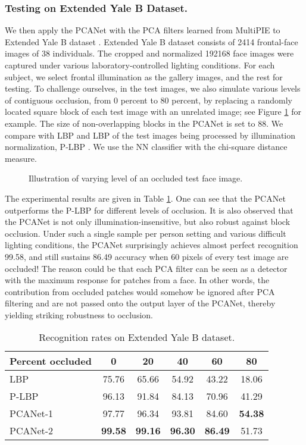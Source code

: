 \documentclass[10pt,journal,compsoc]{IEEEtran}
\begin{document}
\subsubsection{Testing on Extended Yale B Dataset.}\label{sec: ExtendedYaleB}
We then apply the PCANet with the PCA filters learned from MultiPIE to Extended Yale B dataset \cite{Georghiades2001}. Extended Yale B dataset consists of 2414 frontal-face images of 38 individuals. The cropped and normalized 192168 face images were captured under various laboratory-controlled lighting conditions. For each subject, we select frontal illumination as the gallery images, and the rest for testing. To challenge ourselves, in the test images, we also simulate various levels of contiguous occlusion, from 0 percent to 80 percent, by replacing a randomly located square block of each test image with an unrelated image; see Figure \ref{fig: EYaleB_occlusion} for example. The size of non-overlapping blocks in the PCANet is set to 88. We compare with LBP \cite{Ahonen2006} and LBP of the test images being processed by illumination normalization, P-LBP \cite{Tan2010}. We use the NN classifier with the chi-square distance measure.


\begin{figure}[t]
\centering
{}
\caption{Illustration of varying level of an occluded test face image.}\label{fig: EYaleB_occlusion}
\end{figure}


The experimental results are given in Table \ref{table: ExtendedYaleB}. One can see that the PCANet outperforms the P-LBP for different levels of occlusion. It is also observed that the PCANet is not only illumination-insensitive, but also robust against block occlusion. Under such a single sample per person setting and various difficult lighting conditions, the PCANet surprisingly achieves almost perfect recognition 99.58, and still sustains 86.49 accuracy when 60 pixels of every test image are occluded! The reason could be that each PCA filter can be seen as a detector with the maximum response for patches from a face. In other words, the contribution from occluded patches would somehow be ignored after PCA filtering and are not passed onto the output layer of the PCANet, thereby yielding striking robustness to occlusion.

\begin{table}\centering
\caption{Recognition rates  on Extended Yale B dataset.}
\begin{tabular}{l|c|c|c|c|c}
  \hline
Percent occluded & 0 & 20  & 40  & 60  & 80  \\ \hline \hline
  LBP \cite{Ahonen2006} & 75.76 & 65.66 & 54.92 & 43.22  & 18.06 \\
  P-LBP \cite{Tan2010}    & 96.13 & 91.84 & 84.13 & 70.96 & 41.29 \\ \hline
PCANet-1   & 97.77 & 96.34 & 93.81 & 84.60 & {\bf  54.38} \\
  PCANet-2   & {\bf 99.58} & {\bf  99.16} & {\bf 96.30} & {\bf 86.49} & 51.73 \\
  \hline
\end{tabular}\label{table: ExtendedYaleB}
\end{table}
\end{document}
